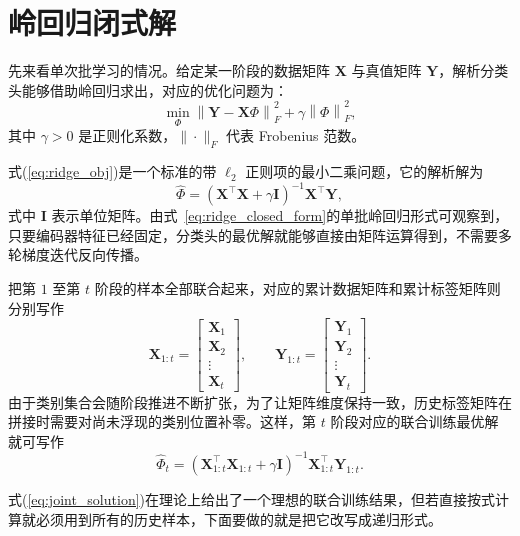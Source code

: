 \section{岭回归闭式解}

先来看单次批学习的情况。给定某一阶段的数据矩阵 $\mathbf{X}$ 与真值矩阵 $\mathbf{Y}$，解析分类头能够借助岭回归求出，对应的优化问题为：
\begin{equation}
\min_{\Phi} \left\|\mathbf{Y}-\mathbf{X}\Phi\right\|_F^2 + \gamma\left\|\Phi\right\|_F^2,
\label{eq:ridge_obj}
\end{equation}
其中 $\gamma > 0$ 是正则化系数，$\|\cdot\|_F$ 代表 Frobenius 范数。

式(\ref{eq:ridge_obj})是一个标准的带 $\ell_2$ 正则项的最小二乘问题，它的解析解为
\begin{equation}
\widehat{\Phi}=\left(\mathbf{X}^{\top}\mathbf{X}+\gamma \mathbf{I}\right)^{-1}\mathbf{X}^{\top}\mathbf{Y},
\label{eq:ridge_closed_form}
\end{equation}
式中 $\mathbf{I}$ 表示单位矩阵。由式~\eqref{eq:ridge_closed_form}的单批岭回归形式可观察到，只要编码器特征已经固定，分类头的最优解就能够直接由矩阵运算得到，不需要多轮梯度迭代反向传播。

把第 $1$ 至第 $t$ 阶段的样本全部联合起来，对应的累计数据矩阵和累计标签矩阵则分别写作
\begin{equation}
\mathbf{X}_{1:t}=
\begin{bmatrix}
\mathbf{X}_1 \\
\mathbf{X}_2 \\
\vdots \\
\mathbf{X}_t
\end{bmatrix},
\qquad
\mathbf{Y}_{1:t}=
\begin{bmatrix}
\mathbf{Y}_1 \\
\mathbf{Y}_2 \\
\vdots \\
\mathbf{Y}_t
\end{bmatrix}.
\end{equation}
由于类别集合会随阶段推进不断扩张，为了让矩阵维度保持一致，历史标签矩阵在拼接时需要对尚未浮现的类别位置补零。这样，第 $t$ 阶段对应的联合训练最优解就可写作
\begin{equation}
\widehat{\Phi}_t=\left(\mathbf{X}_{1:t}^{\top}\mathbf{X}_{1:t}+\gamma \mathbf{I}\right)^{-1}\mathbf{X}_{1:t}^{\top}\mathbf{Y}_{1:t}.
\label{eq:joint_solution}
\end{equation}

式(\ref{eq:joint_solution})在理论上给出了一个理想的联合训练结果，但若直接按式计算就必须用到所有的历史样本，下面要做的就是把它改写成递归形式。

